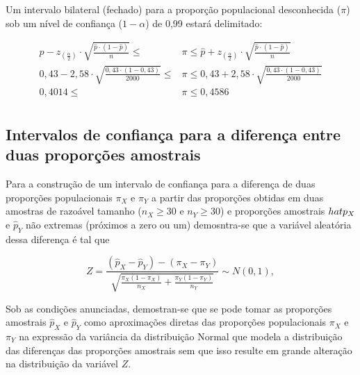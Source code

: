 \documentclass[
]{book}
\begin{document}
\hfill\break

Um intervalo bilateral (fechado) para a proporção populacional desconhecida (\(\pi\)) sob um nível de confiança (\(1-\alpha\)) de 0,99 estará delimitado:

\hfill\break

\begin{align*}
\hat{p} - {z}_{\left(\frac{\alpha }{2}\right)} \cdot  \sqrt{\frac{\hat{p} \cdot \left(1- \hat{p} \right)}{n}}  \le  & \pi  \le  \hat{p} + {z}_{\left(\frac{\alpha }{2}\right)} \cdot \sqrt{\frac{\hat{p} \cdot \left(1-\hat{p} \right)}{n}}\\
0,43 - 2,58 \cdot \sqrt{  \frac{0,43 \cdot (1-0,43)}{2000} }  \le &  \pi \le  0,43 + 2,58 \cdot \sqrt{  \frac{0,43 \cdot (1-0,43)}{2000} }\\
0,4014\le &  \pi \le 0,4586\\
\end{align*}

\hfill\break

\hypertarget{intervalos-de-confianuxe7a-para-a-diferenuxe7a-entre-duas-proporuxe7uxf5es-amostrais}{%
\subsection{Intervalos de confiança para a diferença entre duas proporções amostrais}\label{intervalos-de-confianuxe7a-para-a-diferenuxe7a-entre-duas-proporuxe7uxf5es-amostrais}}

\hfill\break

Para a construção de um intervalo de confiança para a diferença de duas proporções populacionais \(\pi_{X}\) e \(\pi_{Y}\) a partir das proporções obtidas em duas amostras de razoável tamanho (\(n_{X} \ge 30\) e \(n_{Y} \ge 30\)) e proporções amostrais \(\\hat{p}_{X}\) e \(\hat{p}_{Y}\) não extremas (próximos a zero ou um) demosntra-se que a variável aleatória dessa diferença é tal que

\hfill\break

\[
Z=\frac{(\hat{p}_{X}-\hat{p}_{Y}  )- (\pi_{X}-\pi_{Y}) }{\sqrt{ \frac{\pi_{X}(1-\pi_{X})}{n_{X}}+ \frac{\pi_{Y}(1-\pi_{Y})}{n_{Y}}}} \sim N\left(0,1\right),
\]

\hfill\break

Sob as condições anunciadas, demostran-se que se pode tomar as proporções amostrais \(\hat{p}_{X}\) e \(\hat{p}_{Y}\) como aproximações diretas das proporções populacionais \(\pi_{X}\) e \(\pi_{Y}\) na expressão da variância da distribuição Normal que modela a distribuição das diferenças das proporções amostrais sem que isso resulte em grande alteração na distribuição da variável \(Z\).
\end{document}
